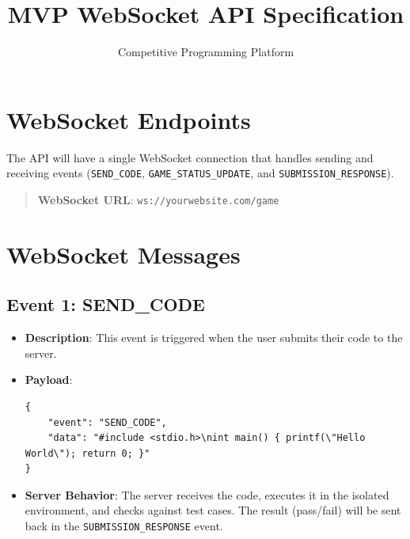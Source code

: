 \documentclass{article}
\title{MVP WebSocket API Specification}
\author{Competitive Programming Platform}
\date{}
\begin{document}
\maketitle

\section{WebSocket Endpoints}

\noindent The API will have a single WebSocket connection that handles sending and receiving events (\texttt{SEND\_CODE}, \texttt{GAME\_STATUS\_UPDATE}, and \texttt{SUBMISSION\_RESPONSE}).

\begin{quote}
\textbf{WebSocket URL}: \texttt{ws://yourwebsite.com/game}
\end{quote}

\section{WebSocket Messages}

\subsection{Event 1: SEND\_CODE}
\begin{itemize}
    \item \textbf{Description}: This event is triggered when the user submits their code to the server.
    \item \textbf{Payload}:
        \begin{verbatim}
{
    "event": "SEND_CODE",
    "data": "#include <stdio.h>\nint main() { printf(\"Hello World\"); return 0; }"
}
        \end{verbatim}
    \item \textbf{Server Behavior}: The server receives the code, executes it in the isolated environment, and checks against test cases. The result (pass/fail) will be sent back in the \texttt{SUBMISSION\_RESPONSE} event.
\end{itemize}
\end{document}
